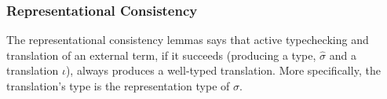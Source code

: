 \documentclass[10pt,preprint]{sigplanconf}
\begin{document}
{%
%
%
%
%
\subsubsection{Representational Consistency}
The representational consistency lemmas says that active typechecking and translation of an external term, if it succeeds (producing a type, $\hat\sigma$ and a translation $\iota$), always produces a well-typed translation. More specifically, the translation's type is the representation type of $\hat\sigma$.

}
\end{document}
